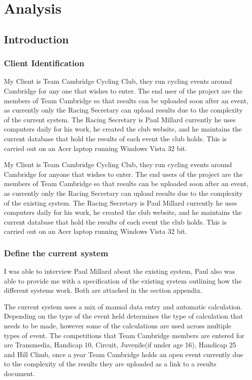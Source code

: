 \chapter{Analysis}

\section{Introduction}

\subsection{Client Identification}

My Client is Team Cambridge Cycling Club, they run cycling events around Cambridge for any one that wishes to enter. The end user of the project are the members of Team Cambridge so that results can be uploaded soon after an event, as currently only the Racing Secretary can upload results due to the complexity of the current system. The Racing Secretary is Paul Millard currently he uses computers daily for his work, he created the club website, and he maintains the current database that hold the results of each event the club holds. This is carried out on an Acer laptop running Windows Vista 32 bit.

My Client is Team Cambridge Cycling Club, they run cycling events around Cambridge for anyone that wishes to enter. The end users of the project are the members of Team Cambridge so that results can be uploaded soon after an event, as currently only the Racing Secretary can upload results due to the complexity of the existing system. The Racing Secretary is Paul Millard currently he uses computers daily for his work, he created the club website, and he maintains the current database that hold the results of each event the club holds. This is carried out on an Acer laptop running Windows Vista 32 bit.


\subsection{Define the current system}
I was able to interview Paul Millard about the existing system, Paul also was able to provide me with a specification of the existing system outlining how the different systems work. Both are attached in the section appendix.


The current system uses a mix of manual data entry and automatic calculation. Depending on the type of the event held determines the type of calculation that needs to be made, however some of the calculations are used across multiple types of event. The competitions that Team Cambridge members are entered for are Transmedia, Handicap 10, Circuit, Juvenile(if under age 16), Handicap 25  and Hill Climb, once a year Team Cambridge holds an open event currently due to the complexity of the results they are uploaded as a link to a results document. 

